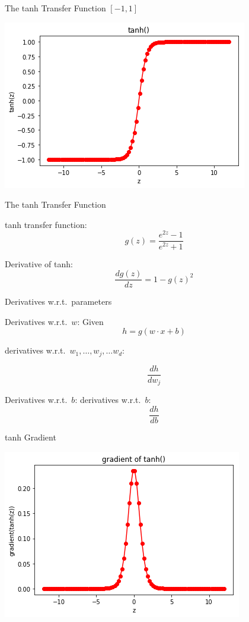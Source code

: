 \begin{frame}{The tanh Transfer Function $[-1,1]$}
\begin{block}{}
\centering
\includegraphics[scale=0.6]{figures/tanh.png}
\end{block}
\end{frame}

\begin{frame}{The tanh Transfer Function}
\begin{block}{tanh transfer function:}
\[ g(z) = \frac{e^{2z} - 1}{e^{2z} + 1} \]
\end{block}

\pause
\begin{block}{Derivative of tanh:}
\[ \frac{d g(z)}{dz} = 1 - g(z)^2 \]
\end{block}
\end{frame}

\begin{frame}{Derivatives w.r.t.\ parameters}
\begin{block}{Derivatives w.r.t.\ $w$:}
Given 
\[ h = g(w \cdot x + b) \]

derivatives w.r.t.\ $w_1, \ldots, w_j, \ldots w_d$:

\[ \frac{dh}{dw_j} \]
\end{block}

\pause
\begin{block}{Derivatives w.r.t.\ $b$:}
derivatives w.r.t.\ $b$:
\[ \frac{dh}{db} \]
\end{block}
\end{frame}

\begin{frame}{tanh Gradient}
\begin{block}{}
\centering
\includegraphics[scale=0.6]{figures/tanhgradient.png}
\end{block}
\end{frame}

